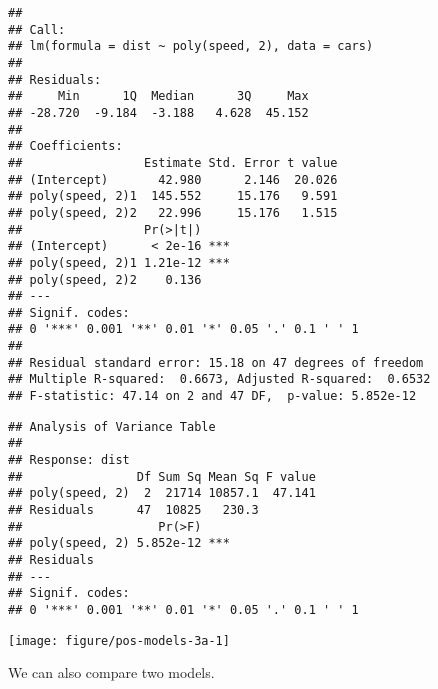 \documentclass[paper=a4,10pt,div=17,headsepline,BCOR=12mm,twoside,open=right]{scrbook}\usepackage{knitr}
\begin{document}
\begin{knitrout}\footnotesize
{}\color{fgcolor}\begin{kframe}
\begin{alltt}
 \hlkwb{<-}  \hlopt{~}  \hlstd{),}  
  \hlstd{=} \hlstd{)} 
 
\end{alltt}
\begin{verbatim}
## 
## Call:
## lm(formula = dist ~ poly(speed, 2), data = cars)
## 
## Residuals:
##     Min      1Q  Median      3Q     Max 
## -28.720  -9.184  -3.188   4.628  45.152 
## 
## Coefficients:
##                 Estimate Std. Error t value
## (Intercept)       42.980      2.146  20.026
## poly(speed, 2)1  145.552     15.176   9.591
## poly(speed, 2)2   22.996     15.176   1.515
##                 Pr(>|t|)    
## (Intercept)      < 2e-16 ***
## poly(speed, 2)1 1.21e-12 ***
## poly(speed, 2)2    0.136    
## ---
## Signif. codes:  
## 0 '***' 0.001 '**' 0.01 '*' 0.05 '.' 0.1 ' ' 1
## 
## Residual standard error: 15.18 on 47 degrees of freedom
## Multiple R-squared:  0.6673,	Adjusted R-squared:  0.6532 
## F-statistic: 47.14 on 2 and 47 DF,  p-value: 5.852e-12
\end{verbatim}
\begin{alltt}
 
\end{alltt}
\begin{verbatim}
## Analysis of Variance Table
## 
## Response: dist
##                Df Sum Sq Mean Sq F value
## poly(speed, 2)  2  21714 10857.1  47.141
## Residuals      47  10825   230.3        
##                   Pr(>F)    
## poly(speed, 2) 5.852e-12 ***
## Residuals                   
## ---
## Signif. codes:  
## 0 '***' 0.001 '**' 0.01 '*' 0.05 '.' 0.1 ' ' 1
\end{verbatim}
\end{kframe}

{\centering \texttt{[image: figure/pos-models-3a-1]} 

}



\end{knitrout}

We can also compare two models.
\end{document}

